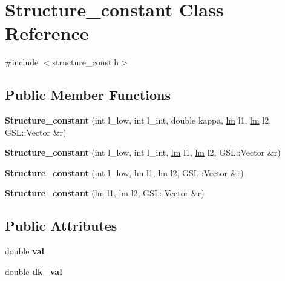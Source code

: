 \hypertarget{classStructure__constant}{}\section{Structure\+\_\+constant Class Reference}
\label{classStructure__constant}


{\ttfamily \#include $<$structure\+\_\+const.\+h$>$}

\subsection*{Public Member Functions}
\begin{DoxyCompactItemize}
\item 
\mbox{\label{classStructure__constant_a3ec54c7f725377c9a0a1c070150ca8ac}} 
{\bfseries Structure\+\_\+constant} (int l\+\_\+low, int l\+\_\+int, double kappa, \hyperlink{structlm}{lm} l1, \hyperlink{structlm}{lm} l2, G\+S\+L\+::\+Vector \&r)
\item 
\mbox{\label{classStructure__constant_a0738527824a89745ccfbf5c3574591e2}} 
{\bfseries Structure\+\_\+constant} (int l\+\_\+low, int l\+\_\+int, \hyperlink{structlm}{lm} l1, \hyperlink{structlm}{lm} l2, G\+S\+L\+::\+Vector \&r)
\item 
\mbox{\label{classStructure__constant_a10517723cc79639846ccbdb08f3c0c3f}} 
{\bfseries Structure\+\_\+constant} (int l\+\_\+low, \hyperlink{structlm}{lm} l1, \hyperlink{structlm}{lm} l2, G\+S\+L\+::\+Vector \&r)
\item 
\mbox{\label{classStructure__constant_aed388efe9aed5398b5a61ee57b269d2f}} 
{\bfseries Structure\+\_\+constant} (\hyperlink{structlm}{lm} l1, \hyperlink{structlm}{lm} l2, G\+S\+L\+::\+Vector \&r)
\end{DoxyCompactItemize}
\subsection*{Public Attributes}
\begin{DoxyCompactItemize}
\item 
\mbox{\label{classStructure__constant_a1155f4863b1c995729abce2c93697595}} 
double {\bfseries val}
\item 
\mbox{\label{classStructure__constant_ac361c2fe9165b85c4ffe4d72d323524a}} 
double {\bfseries dk\+\_\+val}
\end{DoxyCompactItemize}
